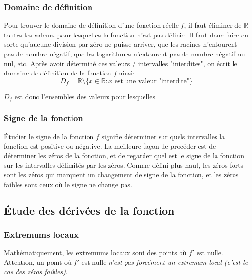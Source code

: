 \documentclass{article}
\begin{document}
\subsubsection{Domaine de définition}
Pour trouver le domaine de définition d'une fonction réelle \(f\), il faut éliminer de \(\mathbb{R}\) toutes les valeurs pour lesquelles la fonction n'est pas définie. Il faut donc faire en sorte qu'aucune division par zéro ne puisse arriver, que les racines n'entourent pas de nombre négatif, que les logarithmes n'entourent pas de nombre négatif ou nul, etc. Après avoir déterminé ces valeurs / intervalles "interdites", on écrit le domaine de définition de la fonction \(f\) ainsi:
\begin{equation*}
	D_f = \mathbb{R} \setminus \{ x \in \mathbb{R} : x \text{ est une valeur "interdite"} \}
\end{equation*}

\(D_f\) est donc l'ensembles des valeurs pour lesquelles 

\subsubsection{Signe de la fonction}
Étudier le signe de la fonction \(f\) signifie déterminer sur quels intervalles la fonction est positive ou négative. La meilleure façon de procéder est de déterminer les zéros de la fonction, et de regarder quel est le signe de la fonction sur les intervalles délimités par les zéros. Comme défini plus haut, les zéros forts sont les zéros qui marquent un changement de signe de la fonction, et les zéros faibles sont ceux où le signe ne change pas.

\subsection{Étude des dérivées de la fonction}

\subsubsection{Extremums locaux}
Mathématiquement, les extremums locaux sont des points où \(f'\) est nulle. Attention, un point où \(f'\) est nulle \emph{n'est pas forcément un extremum local (c'est le cas des zéros faibles)}. \\
\end{document}
